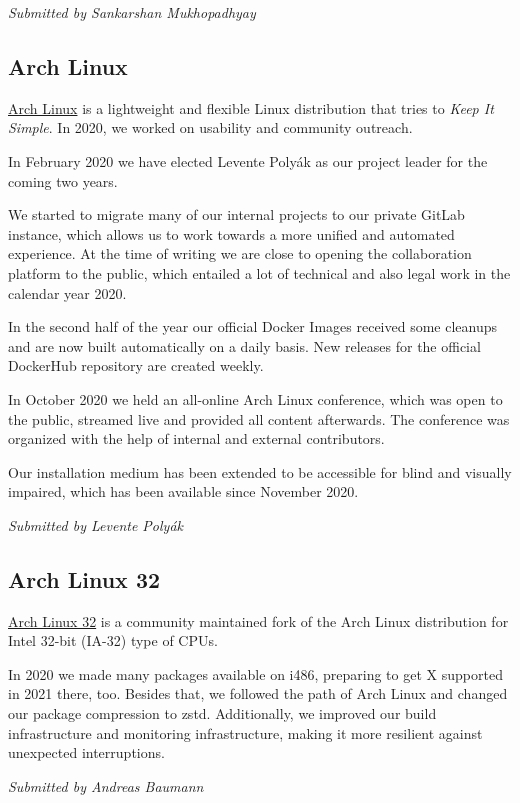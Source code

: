 \documentclass[a4paper]{report}
\begin{document}
{\em Submitted by Sankarshan Mukhopadhyay}

\subsection{Arch Linux}

\href{https://archlinux.org/}{Arch Linux} is a lightweight and flexible Linux distribution that tries to \textit{Keep It Simple}.  In 2020, we worked on usability and community outreach.

In February 2020 we have elected Levente Polyák as our project leader for the coming two years.

We started to migrate many of our internal projects to our private GitLab instance, which allows us to work towards a more unified and automated experience. At the time of writing we are close to opening the collaboration platform to the public, which entailed a lot of technical and also legal work in the calendar year 2020.

In the second half of the year our official Docker Images received some cleanups and are now built automatically on a daily basis. New releases for the official DockerHub repository are created weekly.

In October 2020 we held an all-online Arch Linux conference, which was open to the public, streamed live and provided all content afterwards. The conference was organized with the help of internal and external contributors.

Our installation medium has been extended to be accessible for blind and visually impaired, which has been available since November 2020.

{\em Submitted by Levente Polyák}

\subsection{Arch Linux 32}

\href{https://archlinux32.org/}{Arch Linux 32} is a community maintained fork of the Arch Linux distribution for Intel 32-bit (IA-32) type of CPUs.

In 2020 we made many packages available on i486, preparing to get X supported in 2021 there, too.  Besides that, we followed the path of Arch Linux and changed our package compression to zstd.  Additionally, we improved our build infrastructure and monitoring infrastructure, making it more resilient against unexpected interruptions.

{\em Submitted by Andreas Baumann}
\end{document}
